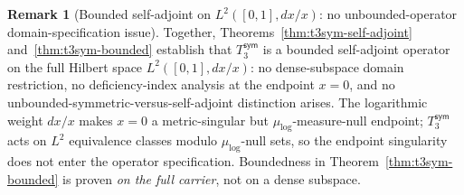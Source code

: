 \documentclass[11pt,a4paper]{amsart}
\theoremstyle{plain}
\theoremstyle{definition}
\newtheorem{remark}[theorem]{Remark}
\newcommand{\Tsym}{T_3^{\textsf{sym}}}
\begin{document}
\begin{remark}[{Bounded self-adjoint on $L^{2}([0,1], dx/x)$: no unbounded-operator domain-specification issue}]\label{rem:no-domain-issue}
Together, Theorems~\ref{thm:t3sym-self-adjoint} and~\ref{thm:t3sym-bounded} establish that $\Tsym$ is a bounded self-adjoint operator on the full Hilbert space $L^{2}([0,1], dx/x)$: no dense-subspace domain restriction, no deficiency-index analysis at the endpoint $x = 0$, and no unbounded-symmetric-versus-self-adjoint distinction arises. The logarithmic weight $dx/x$ makes $x = 0$ a metric-singular but $\mu_{\log}$-measure-null endpoint; $\Tsym$ acts on $L^{2}$ equivalence classes modulo $\mu_{\log}$-null sets, so the endpoint singularity does not enter the operator specification. Boundedness in Theorem~\ref{thm:t3sym-bounded} is proven \emph{on the full carrier}, not on a dense subspace.
\end{remark}
\end{document}
